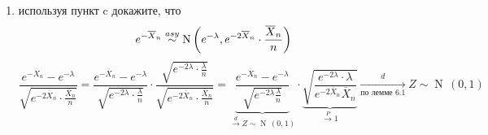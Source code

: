 {\begin{enumerate}
        Тогда по теореме 6.1
        \[e^{-\overline{X}_n} = g\left(\widehat{\theta}_n\right) \asy \operatorname{N}\left(g(\theta) = e^{-\lambda}, \left(g'(\theta)\right)^2 \cdot \frac{\sigma^2(\theta)}{n} = e^{-2\lambda} \cdot \frac{\lambda}{n}\right)\]
        \item[d)] используя пункт c докажите, что
        \[e^{-\overline{X}_n} \overset{asy}{\sim} \operatorname{N}\left(e^{-\lambda}, e^{-2\overline{X}_n} \cdot \frac{\overline{X}_n}{n}\right)\]
        \[\frac{e^{-\overline{X}_n} - e^{-\lambda}}{\sqrt{e^{-2\overline{X}_n} \cdot \frac{\overline{X}_n}{n}}} = \frac{e^{-\overline{X}_n} - e^{-\lambda}}{\sqrt{e^{-2\lambda}\cdot\frac{\lambda}{n}}} \cdot \frac{\sqrt{e^{-2\lambda}\cdot\frac{\lambda}{n}}}{\sqrt{e^{-2\overline{X}_n}\cdot\frac{\overline{X}_n}{n}}} = \underbrace{\frac{e^{-\overline{X}_n} - e^{-\lambda}}{\sqrt{e^{-2\lambda}\frac{\lambda}{n}}}}_{\xrightarrow{d} Z \sim \operatorname{N}\,(0, 1)} \cdot \underbrace{\sqrt{\frac{e^{-2\lambda}\cdot\lambda}{e^{-2\overline{X}_n}\overline{X}_n}}}_{\xrightarrow{P} 1} \xrightarrow[\text{по лемме 6.1}]{d} Z \sim \operatorname{N}\,(0,1)\]

    \end{enumerate}
}
\setcounter{maindf}{7}
\setcounter{subdf}{0}

\setcounter{mainth}{7}
\setcounter{subth}{0}

\setcounter{mainpr}{7}
\setcounter{subpr}{0}

\setcounter{mainex}{7}
\setcounter{subex}{0}

\setcounter{mainta}{7}
\setcounter{subta}{0}

